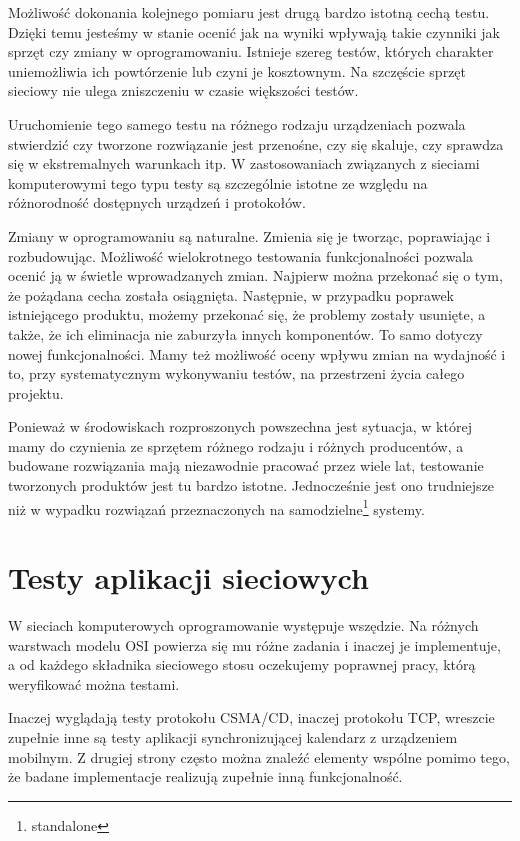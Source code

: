 \documentclass[00-praca-magisterska.tex]{subfiles}
\begin{document}
Możliwość dokonania kolejnego pomiaru jest drugą bardzo istotną cechą testu.
Dzięki temu jesteśmy w stanie ocenić jak na wyniki wpływają takie czynniki jak
sprzęt czy zmiany w oprogramowaniu. Istnieje szereg testów, których charakter
uniemożliwia ich powtórzenie lub czyni je kosztownym. Na szczęście sprzęt
sieciowy nie ulega zniszczeniu w czasie większości testów.

Uruchomienie tego samego testu na różnego rodzaju urządzeniach pozwala
stwierdzić czy tworzone rozwiązanie jest przenośne, czy się skaluje, czy
sprawdza się w ekstremalnych warunkach itp. W zastosowaniach związanych z
sieciami komputerowymi tego typu testy są szczególnie istotne ze względu na
różnorodność dostępnych urządzeń i protokołów.

Zmiany w oprogramowaniu są naturalne. Zmienia się je tworząc, poprawiając i
rozbudowując. Możliwość wielokrotnego testowania funkcjonalności pozwala ocenić
ją w świetle wprowadzanych zmian. Najpierw można przekonać się o tym, że
pożądana cecha została osiągnięta. Następnie, w przypadku poprawek istniejącego
produktu, możemy przekonać się, że problemy zostały usunięte, a także, że ich
eliminacja nie zaburzyła innych komponentów. To samo dotyczy nowej
funkcjonalności. Mamy też możliwość oceny wpływu zmian na wydajność i to, przy
systematycznym wykonywaniu testów, na przestrzeni życia całego projektu.

Ponieważ w środowiskach rozproszonych powszechna jest sytuacja, w której mamy
do czynienia ze sprzętem różnego rodzaju i różnych producentów, a budowane
rozwiązania mają niezawodnie pracować przez wiele lat, testowanie tworzonych
produktów jest tu bardzo istotne. Jednocześnie jest ono trudniejsze niż w
wypadku rozwiązań przeznaczonych na samodzielne\footnote{standalone} systemy.

\section{Testy aplikacji sieciowych}

W sieciach komputerowych oprogramowanie występuje wszędzie. Na różnych
warstwach modelu OSI powierza się mu różne zadania i inaczej je implementuje, a
od każdego składnika sieciowego stosu oczekujemy poprawnej pracy, którą
weryfikować można testami.

Inaczej wyglądają testy protokołu CSMA/CD, inaczej protokołu TCP, wreszcie
zupełnie inne są testy aplikacji synchronizującej kalendarz z urządzeniem
mobilnym. Z drugiej strony często można znaleźć elementy wspólne pomimo tego,
że badane implementacje realizują zupełnie inną funkcjonalność.
\end{document}
